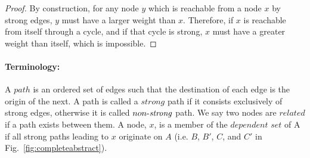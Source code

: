 \begin{proof}
By construction, for any node $y$ which is reachable from a node $x$ by
strong edges, $y$ must have
a larger weight than $x$. Therefore, if $x$ is reachable from itself through a cycle,
and if that cycle is strong, $x$ must have a greater
weight than itself, which is impossible.
\end{proof}

\paragraph{Terminology:}
A $path$ is an ordered set of edges such that the destination
of each edge is the origin of the next.
A path is called a $strong$ path if it consists
exclusively of strong edges, otherwise it is called
$\mathop{\mbox{$non$-$\mathit{strong}$}}$ path. We say two nodes are $related$ if
a path exists between them.
A node, $x$, is a member of the $dependent$ $set$ of A if all strong paths leading to $x$ originate on $A$
(i.e. $B$, $B'$, $C$, and $C'$ in Fig.~\ref{fig:completeabstract}).

